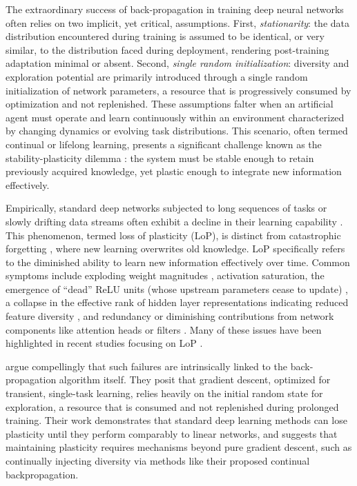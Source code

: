 \documentclass{article}
\begin{document}
The extraordinary success of back-propagation in training deep neural networks often relies on two implicit, yet critical, assumptions. First, \emph{stationarity}: the data distribution encountered during training is assumed to be identical, or very similar, to the distribution faced during deployment, rendering post-training adaptation minimal or absent. Second, \emph{single random initialization}: diversity and exploration potential are primarily introduced through a single random initialization of network parameters, a resource that is progressively consumed by optimization and not replenished. These assumptions falter when an artificial agent must operate and learn continuously within an environment characterized by changing dynamics or evolving task distributions. This scenario, often termed continual or lifelong learning, presents a significant challenge known as the stability-plasticity dilemma \citep{abraham2005memory, chaudhry2018riemannian}: the system must be stable enough to retain previously acquired knowledge, yet plastic enough to integrate new information effectively.

Empirically, standard deep networks subjected to long sequences of tasks or slowly drifting data streams often exhibit a decline in their learning capability \citep{dohare2024loss, berariu2021plasticity, dohare2021continual, nikishin2022primacy, lyle2023understanding}. This phenomenon, termed loss of plasticity (LoP), is distinct from catastrophic forgetting \citep{mccloskey1989catastrophic, ratcliff1990connectionist, french1999catastrophic}, where new learning overwrites old knowledge. LoP specifically refers to the diminished ability to learn new information effectively over time. Common symptoms include exploding weight magnitudes \citep{nikishin2022primacy}, activation saturation, the emergence of ``dead'' ReLU units (whose upstream parameters cease to update) \citep{nair2010rectified, sokar2023dormant, dohare2021continual, lyle2022understanding}, a collapse in the effective rank of hidden layer representations indicating reduced feature diversity \citep{papyan2020prevalence, huh2022lowrank, kumar2020implicit, gulcehre2022empirical}, and redundancy or diminishing contributions from network components like attention heads or filters \citep{lyle2023understanding}. Many of these issues have been highlighted in recent studies focusing on LoP \citep{dohare2023maintaining, kumar2024regenerative, ash2020warmstarting}.

\citet{dohare2024loss} argue compellingly that such failures are intrinsically linked to the back-propagation algorithm itself. They posit that gradient descent, optimized for transient, single-task learning, relies heavily on the initial random state for exploration, a resource that is consumed and not replenished during prolonged training. Their work demonstrates that standard deep learning methods can lose plasticity until they perform comparably to linear networks, and suggests that maintaining plasticity requires mechanisms beyond pure gradient descent, such as continually injecting diversity via methods like their proposed continual backpropagation.
\end{document}
